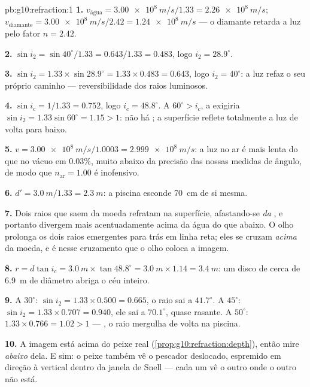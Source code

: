 \begin{solution}{pb:g10:refraction:1}
\textbf{1.} $v_{\text{água}} = \qty{3.00e8}{m/s}/1.33 =
\qty{2.26e8}{m/s}$; $v_{\text{diamante}} = \qty{3.00e8}{m/s}/2.42 =
\qty{1.24e8}{m/s}$ --- o diamante retarda a luz pelo fator $n = 2.42$.

\textbf{2.} $\sin i_2 = \sin 40^\circ / 1.33 = 0.643/1.33 = 0.483$, logo
$i_2 = 28.9^\circ$.

\textbf{3.} $\sin i_2 = 1.33 \times \sin 28.9^\circ = 1.33 \times
0.483 = 0.643$, logo $i_2 = 40^\circ$: a luz refaz o seu próprio caminho
--- reversibilidade dos raios luminosos.

\textbf{4.} $\sin i_c = 1/1.33 = 0.752$, logo $i_c = 48.8^\circ$. A
$60^\circ > i_c$, a  exigiria $\sin i_2 = 1.33 \sin
60^\circ = 1.15 > 1$: não há ; a superfície reflete
totalmente a luz de volta para baixo.

\textbf{5.} $v = \qty{3.00e8}{m/s}/1.0003 = \qty{2.999e8}{m/s}$: a luz no
ar é mais lenta do que no vácuo em $0.03\%$, muito abaixo da precisão das
nossas medidas de ângulo, de modo que $n_{\text{ar}} = 1.00$ é inofensivo.

\textbf{6.} $d' = \qty{3.0}{m}/1.33 = \qty{2.3}{m}$: a piscina esconde
\qty{70}{cm} de si mesma.

\textbf{7.} Dois raios que saem da moeda refratam na superfície,
afastando-se \emph{da} , e portanto divergem mais acentuadamente
acima da água do que abaixo. O olho prolonga os dois raios emergentes
para trás em linha reta; eles se cruzam \emph{acima} da moeda, e é nesse
cruzamento que o olho coloca a imagem.

\textbf{8.} $r = d \tan i_c = \qty{3.0}{m} \times \tan 48.8^\circ =
\qty{3.0}{m} \times 1.14 = \qty{3.4}{m}$: um disco de cerca de
\qty{6.9}{m} de diâmetro abriga o céu inteiro.

\textbf{9.} A $30^\circ$: $\sin i_2 = 1.33 \times 0.500 = 0.665$, o raio
sai a $41.7^\circ$. A $45^\circ$: $\sin i_2 = 1.33 \times 0.707 = 0.940$,
ele sai a $70.1^\circ$, quase rasante. A $50^\circ$:
$1.33 \times 0.766 = 1.02 > 1$ --- , o raio mergulha de
volta na piscina.

\textbf{10.} A imagem está acima do peixe real
(\cref{prop:g10:refraction:depth}), então mire \emph{abaixo} dela. E sim:
o peixe também vê o pescador deslocado, espremido em direção à vertical
dentro da janela de Snell --- cada um vê o outro onde o outro não está.


\end{solution}
